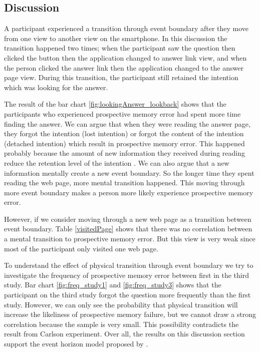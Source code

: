 \subsection{Discussion}
A participant experienced a transition through event boundary after they move from one view to another view on the smartphone.
In this discussion the transition happened two times; when the participant saw the question then clicked the button then the application changed to answer link view,
and when the person clicked the answer link then the application changed to the answer page view.
During this transition, the participant still retained the intention which was looking for the answer.

The result of the bar chart \ref{fig:lookingAnswer_lookback}  shows that the participants who experienced prospective memory error had spent more time finding the answer.
We can argue that when they were reading the answer page, they forgot the intention (lost intention) or forgot the content of the intention (detached intention) which result in prospective memory error.
This happened probably because the amount of new information they received during reading reduce the retention level of the intention \citep{Reason1984}.
We can also argue that a new information mentally create a new event boundary. So the longer time they spent reading the web page, more mental transition happened.
This moving through more event boundary makes a person more likely experience prospective memory error.

However, if we consider moving through a new web page as a transition between event boundary. Table \ref{visitedPage} shows that there was no correlation between a mental transition to prospective memory error.
But this view is very weak since most of the participant only visited one web page.

To understand the effect of physical transition through event boundary we try to investigate the frequency of prospective memory error between first in the third study.
Bar chart \ref{fig:freq_study1} and \ref{fig:freq_study3} shows that the participant on the third study forgot the question more frequently than the first study. However,
we can only see the probability that physical transition will increase the likeliness of prospective memory failure, but
we cannot draw a strong correlation because the sample is very small.
This possibility contradicts the result from Carlson experiment.
Over all, the results on this discussion section support the event horizon model proposed by \cite{Radvansky2006}.
